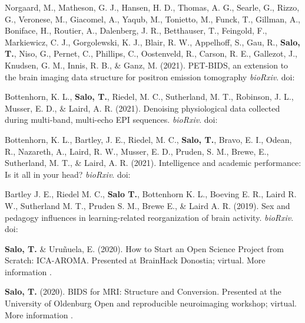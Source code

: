 \documentclass[10pt]{article}
\newcommand{\sectionstyle}{\LARGE \fontfamily{lmr}\selectfont}
\newcommand{\textlink}[3][blue]{\href{#2}{\color{#1}{#3}}}
\begin{document}
\begin{hangparas}{.25in}{1}

	Norgaard, M., Matheson, G. J., Hansen, H. D., Thomas, A. G., Searle, G., Rizzo, G.,
	Veronese, M., Giacomel, A., Yaqub, M., Tonietto, M., Funck, T., Gillman, A.,
	Boniface, H., Routier, A., Dalenberg, J. R., Betthauser, T., Feingold, F.,
	Markiewicz, C. J., Gorgolewski, K. J., Blair, R. W., Appelhoff, S., Gau, R.,
	\textbf{Salo, T.}, Niso, G., Pernet, C., Phillips, C., Oostenveld, R., Carson, R. E.,
	Gallezot, J., Knudsen, G. M., Innis, R. B., \& Ganz, M. (2021).
	PET-BIDS, an extension to the brain imaging data structure for positron emission tomography
	\emph{bioRxiv}.
	doi:\textlink{https://doi.org/10.1101/2021.06.16.448390}{10.1101/2021.06.16.448390}

	\bigskip

	Bottenhorn, K. L., \textbf{Salo, T.}, Riedel, M. C., Sutherland, M. T., Robinson, J. L.,
	Musser, E. D., \& Laird, A. R. (2021).
	Denoising physiological data collected during multi-band, multi-echo EPI sequences.
	\emph{bioRxiv}.
	doi:\textlink{https://doi.org/10.1101/2021.04.01.437293}{10.1101/2021.04.01.437293}

	\bigskip

	Bottenhorn, K. L., Bartley, J. E., Riedel, M. C., \textbf{Salo, T.}, Bravo, E. I.,
	Odean, R., Nazareth, A., Laird, R. W., Musser, E. D., Pruden, S. M., Brewe, E.,
	Sutherland, M. T., \& Laird, A. R. (2021).
	Intelligence and academic performance: Is it all in your head?
	\emph{bioRxiv}.
	doi:\textlink{https://doi.org/10.1101/2021.01.23.427928}{10.1101/2021.01.23.427928}

	\bigskip

	Bartley J. E., Riedel M. C., \textbf{Salo T.}, Bottenhorn K. L.,
	Boeving E. R., Laird R. W., Sutherland M. T., Pruden S. M., Brewe E., \&
	Laird A. R. (2019).
	Sex and pedagogy influences in learning-related reorganization of brain activity.
	\emph{bioRxiv}. doi:\textlink{https://doi.org/10.1101/791301}{10.1101/791301}

\end{hangparas}

\bigskip

\begin{center}\sectionstyle{INVITED TALKS AND SOFTWARE DEMONSTRATIONS}\end{center}

\begin{hangparas}{.25in}{1}

    \textbf{Salo, T.} \& Uruñuela, E. (2020).
	How to Start an Open Science Project from Scratch: ICA-AROMA.
    Presented at BrainHack Donostia; virtual.
    More information
	\textlink{https://nbclab.github.io/presentations/salo-neurosynth-presentation}{here}.

	\bigskip

    \textbf{Salo, T.} (2020).
	BIDS for MRI: Structure and Conversion.
	Presented at the University of Oldenburg Open and reproducible neuroimaging workshop;
    virtual.
    More information \textlink{https://figshare.com/projects/BIDS_for_MRI_Structure_and_Conversion/92066}{here}.

\end{hangparas}
\end{document}
